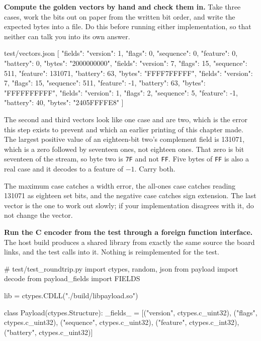 \begin{steps}
\item \textbf{Compute the golden vectors by hand and check them in.} Take three
cases, work the bits out on paper from the written bit order, and write the
expected bytes into a file. Do this before running either implementation, so
that neither can talk you into its own answer.
\begin{plaincode}
test/vectors.json
[
  {"fields": {"version": 1, "flags": 0, "sequence": 0,
              "feature": 0, "battery": 0},
   "bytes": "2000000000"},
  {"fields": {"version": 7, "flags": 15, "sequence": 511,
              "feature": 131071, "battery": 63},
   "bytes": "FFFF7FFFFF"},
  {"fields": {"version": 7, "flags": 15, "sequence": 511,
              "feature": -1, "battery": 63},
   "bytes": "FFFFFFFFFF"},
  {"fields": {"version": 1, "flags": 2, "sequence": 5,
              "feature": -1, "battery": 40},
   "bytes": "2405FFFFE8"}
]
\end{plaincode}
The second and third vectors look like one case and are two, which is the error
this step exists to prevent and which an earlier printing of this chapter made.
The largest positive value of an eighteen-bit two's complement field is 131071,
which is a zero followed by seventeen ones, not eighteen ones. That zero is bit
seventeen of the stream, so byte two is \texttt{7F} and not \texttt{FF}. Five
bytes of \texttt{FF} is also a real case and it decodes to a feature of
\(-1\). Carry both.

The maximum case catches a width error, the all-ones case catches reading 131071
as eighteen set bits, and the negative case catches sign extension. The last
vector is the one to work out slowly; if your implementation disagrees with it,
do not change the vector.

\item \textbf{Run the C encoder from the test through a foreign function
interface.} The host build produces a shared library from exactly the same
source the board links, and the test calls into it. Nothing is reimplemented for
the test.
\begin{pycode}
# test/test_roundtrip.py
import ctypes, random, json
from payload import decode
from payload_fields import FIELDS

lib = ctypes.CDLL("./build/libpayload.so")

class Payload(ctypes.Structure):
    _fields_ = [("version", ctypes.c_uint32), ("flags", ctypes.c_uint32),
                ("sequence", ctypes.c_uint32), ("feature", ctypes.c_int32),
                ("battery", ctypes.c_uint32)]


\end{pycode}
\end{steps}
